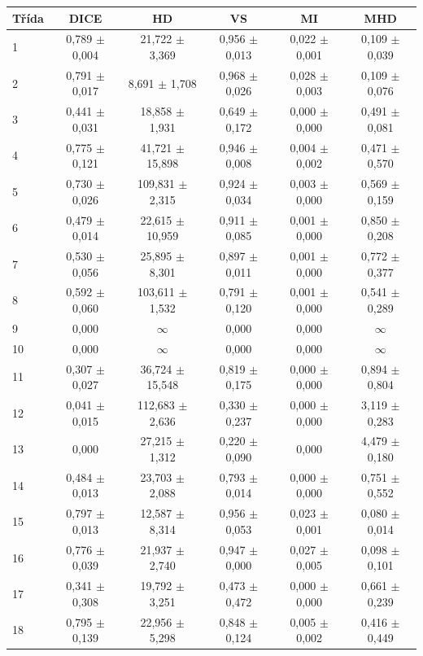 \begin{tabular}{l c c c c c}
 \hline
Třída & DICE & HD & VS & MI & MHD \\ \hline
1 & 0,789 $\pm$ 0,004 & 21,722 $\pm$ 3,369 & 0,956 $\pm$ 0,013 & 0,022 $\pm$ 0,001 & 0,109 $\pm$ 0,039 \\
2 & 0,791 $\pm$ 0,017 & 8,691 $\pm$ 1,708 & 0,968 $\pm$ 0,026 & 0,028 $\pm$ 0,003 & 0,109 $\pm$ 0,076 \\
3 & 0,441 $\pm$ 0,031 & 18,858 $\pm$ 1,931 & 0,649 $\pm$ 0,172 & 0,000 $\pm$ 0,000 & 0,491 $\pm$ 0,081 \\
4 & 0,775 $\pm$ 0,121 & 41,721 $\pm$ 15,898 & 0,946 $\pm$ 0,008 & 0,004 $\pm$ 0,002 & 0,471 $\pm$ 0,570 \\
5 & 0,730 $\pm$ 0,026 & 109,831 $\pm$ 2,315 & 0,924 $\pm$ 0,034 & 0,003 $\pm$ 0,000 & 0,569 $\pm$ 0,159 \\
6 & 0,479 $\pm$ 0,014 & 22,615 $\pm$ 10,959 & 0,911 $\pm$ 0,085 & 0,001 $\pm$ 0,000 & 0,850 $\pm$ 0,208 \\
7 & 0,530 $\pm$ 0,056 & 25,895 $\pm$ 8,301 & 0,897 $\pm$ 0,011 & 0,001 $\pm$ 0,000 & 0,772 $\pm$ 0,377 \\
8 & 0,592 $\pm$ 0,060 & 103,611 $\pm$ 1,532 & 0,791 $\pm$ 0,120 & 0,001 $\pm$ 0,000 & 0,541 $\pm$ 0,289 \\
9 & 0,000 & $\infty$ & 0,000 & 0,000 & $\infty$ \\
10 & 0,000 & $\infty$ & 0,000 & 0,000 & $\infty$ \\
11 & 0,307 $\pm$ 0,027 & 36,724 $\pm$ 15,548 & 0,819 $\pm$ 0,175 & 0,000 $\pm$ 0,000 & 0,894 $\pm$ 0,804 \\
12 & 0,041 $\pm$ 0,015 & 112,683 $\pm$ 2,636 & 0,330 $\pm$ 0,237 & 0,000 $\pm$ 0,000 & 3,119 $\pm$ 0,283 \\
13 & 0,000 & 27,215 $\pm$ 1,312 & 0,220 $\pm$ 0,090 & 0,000 & 4,479 $\pm$ 0,180 \\
14 & 0,484 $\pm$ 0,013 & 23,703 $\pm$ 2,088 & 0,793 $\pm$ 0,014 & 0,000 $\pm$ 0,000 & 0,751 $\pm$ 0,552 \\
15 & 0,797 $\pm$ 0,013 & 12,587 $\pm$ 8,314 & 0,956 $\pm$ 0,053 & 0,023 $\pm$ 0,001 & 0,080 $\pm$ 0,014 \\
16 & 0,776 $\pm$ 0,039 & 21,937 $\pm$ 2,740 & 0,947 $\pm$ 0,000 & 0,027 $\pm$ 0,005 & 0,098 $\pm$ 0,101 \\
17 & 0,341 $\pm$ 0,308 & 19,792 $\pm$ 3,251 & 0,473 $\pm$ 0,472 & 0,000 $\pm$ 0,000 & 0,661 $\pm$ 0,239 \\
18 & 0,795 $\pm$ 0,139 & 22,956 $\pm$ 5,298 & 0,848 $\pm$ 0,124 & 0,005 $\pm$ 0,002 & 0,416 $\pm$ 0,449 \\

\end{tabular}
